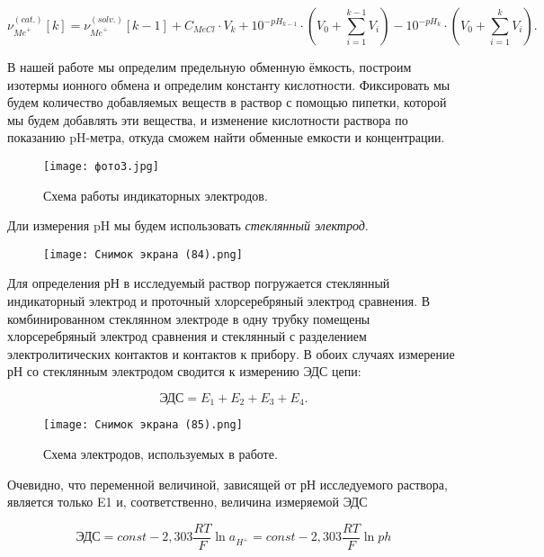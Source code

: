 \documentclass[a4paper,12pt]{article} %
\begin{document}
\begin{equation}
    \nu_{{Me}^+}^{(cat.)} [k] = \nu_{{Me}^+}^{(solv.)} [k-1] + C_{MeCl} \cdot V_k + 10^{-pH_{k-1}} \cdot (V_0 + \sum_{i=1}^{k-1}V_i) - 10^{-pH_k} \cdot (V_0 + \sum_{i=1}^{k}V_i).
\end{equation}

В нашей работе мы определим предельную обменную ёмкость, построим изотермы ионного обмена и определим константу кислотности. Фиксировать мы будем количество добавляемых веществ в раствор с помощью пипетки, которой мы будем добавлять эти вещества, и изменение кислотности раствора по показанию pH-метра, откуда сможем найти обменные емкости и концентрации.

\begin{figure}[H]
    \centering
    \texttt{[image: фото3.jpg]}
    \label{fig:enter-label}
    \caption{Схема работы индикаторных электродов.}
\end{figure}
Дли измерения pH мы будем использовать \textit{стеклянный электрод}. 

\begin{figure}[H]
    \centering
    \texttt{[image: Снимок экрана (84).png]}
    \label{fig:enter-label}
\end{figure}

Для определения рН в исследуемый раствор погружается стеклянный индикаторный электрод и
проточный хлорсеребряный электрод сравнения. В комбинированном стеклянном электроде в
одну трубку помещены хлорсеребряный электрод сравнения и стеклянный с разделением
электролитических контактов и контактов к прибору. В обоих случаях измерение рН со
стеклянным электродом сводится к измерению ЭДС цепи:

\begin{equation}
    \textrm{ЭДС} = E_1 + E_2 +E_3 +E_4.
\end{equation}

\begin{figure}[H]
    \centering
    \texttt{[image: Снимок экрана (85).png]}
    \label{fig:enter-label}
    \caption{Схема электродов, используемых в работе.}
\end{figure}

Очевидно, что переменной величиной, зависящей от рН исследуемого раствора, является только
E1 и, соответственно, величина измеряемой ЭДС

\begin{equation}
    \textrm{ЭДС} = const - 2,303 \frac{RT}{F} \ln a_{{H}^+} = const - 2,303 \frac{RT}{F} \ln ph
\end{equation}
\end{document}
